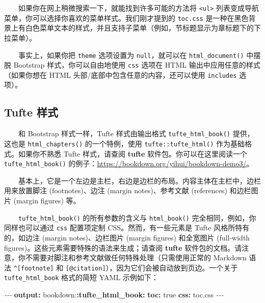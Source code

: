\documentclass[
  12pt,
]{krantz}
\newenvironment{Shaded}{\begin{snugshade}}{\end{snugshade}}
\newcommand{\AttributeTok}[1]{\textcolor[rgb]{0.13,0.29,0.53}{#1}}
\newcommand{\CharTok}[1]{\textcolor[rgb]{0.31,0.60,0.02}{#1}}
\newcommand{\FunctionTok}[1]{\textcolor[rgb]{0.13,0.29,0.53}{\textbf{#1}}}
\newcommand{\KeywordTok}[1]{\textcolor[rgb]{0.13,0.29,0.53}{\textbf{#1}}}
\newcommand{\PreprocessorTok}[1]{\textcolor[rgb]{0.56,0.35,0.01}{\textit{#1}}}
\theoremstyle{definition}
\theoremstyle{definition}
\theoremstyle{definition}
\theoremstyle{definition}
\theoremstyle{remark}
\begin{document}
  如果你在网上稍微搜索一下，就能找到许多可能的方法将 \texttt{\textless{}ul\textgreater{}} 列表变成导航菜单，你可以选择你喜欢的菜单样式。我们刚才提到的 \texttt{toc.css} 是一种在黑色背景上有白色菜单文本的样式，并且支持子菜单（例如，节标题显示为章标题下的下拉菜单）。

  事实上，如果你把 \texttt{theme} 选项设置为 \texttt{null}，就可以在 \texttt{html\_document()} 中摆脱 Bootstrap 样式，你可以自由地使用 \texttt{css} 选项在 HTML 输出中应用任意的样式（如果你想在 HTML 头部/底部中包含任意的内容，还可以使用 \texttt{includes} 选项）。

\hypertarget{tufte-style}{%
\subsection{Tufte 样式}\label{tufte-style}}

  和 Bootstrap 样式一样，Tufte 样式由输出格式 \texttt{tufte\_html\_book()} 提供，这也是 \texttt{html\_chapters()} 的一个特例，使用 \texttt{tufte::tufte\_html()} 作为基础格式。如果你不熟悉 Tufte 样式，请查阅 \textbf{tufte} 软件包\citep{R-tufte}。你可以在这里阅读一个 \texttt{tufte\_html\_book()} 的例子：\url{https://bookdown.org/yihui/bookdown-demo3/}。

  基本上，它是一个左边是主栏，右边是边栏的布局。内容主体在主栏中，边栏用来放置脚注 (footnotes)、边注 (margin notes)、参考文献 (references) 和边栏图片 (margin figures) 等。

  \texttt{tufte\_html\_book()} 的所有参数的含义与 \texttt{html\_book()} 完全相同，例如，你同样也可以通过 \texttt{css} 配置项定制 CSS。然而，有一些元素是 Tufte 风格所特有的，如边注 (margin notes)、边栏图片 (margin figures) 和全宽图片 (full-width figures)。这些元素需要特殊的语法来生成；请查阅 \textbf{tufte} 软件包的文档。请注意，你不需要对脚注和参考文献做任何特殊处理（只需使用正常的 Markdown 语法 \texttt{\^{}{[}footnote{]}} 和 \texttt{{[}@citation{]}}），因为它们会被自动放到页边。一个关于 \texttt{tufte\_html\_book} 格式的简短 YAML 示例如下：

\begin{Shaded}
\begin{Highlighting}[]
\PreprocessorTok{{-}{-}{-}}
\FunctionTok{output}\KeywordTok{:}
\AttributeTok{  bookdown:}\FunctionTok{:tufte\_html\_book}\KeywordTok{:}
\AttributeTok{    }\FunctionTok{toc}\KeywordTok{:}\AttributeTok{ }\CharTok{true}
\AttributeTok{    }\FunctionTok{css}\KeywordTok{:}\AttributeTok{ toc.css}
\PreprocessorTok{{-}{-}{-}}
\end{Highlighting}
\end{Shaded}
\end{document}

